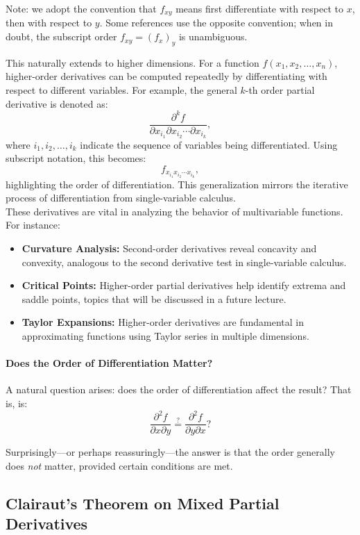 \noindent Note: we adopt the convention that \( f_{xy} \) means first differentiate with respect to \( x \), then with respect to \( y \). Some references use the opposite convention; when in doubt, the subscript order \( f_{xy} = (f_x)_y \) is unambiguous.

\noindent This naturally extends to higher dimensions. For a function \( f(x_1, x_2, \ldots, x_n) \), higher-order derivatives can be computed repeatedly by differentiating with respect to different variables. For example, the general \( k \)-th order partial derivative is denoted as:
\[
\frac{\partial^k f}{\partial x_{i_1} \partial x_{i_2} \cdots \partial x_{i_k}},
\]
where \( i_1, i_2, \ldots, i_k \) indicate the sequence of variables being differentiated. Using subscript notation, this becomes:
\[
f_{x_{i_1}x_{i_2}\cdots x_{i_k}},
\]
highlighting the order of differentiation. This generalization mirrors the iterative process of differentiation from single-variable calculus. \\

\noindent These derivatives are vital in analyzing the behavior of multivariable functions. For instance:
\begin{itemize}
    \item \textbf{Curvature Analysis:} Second-order derivatives reveal concavity and convexity, analogous to the second derivative test in single-variable calculus.
    \item \textbf{Critical Points:} Higher-order partial derivatives help identify extrema and saddle points, topics that will be discussed in a future lecture.
    \item \textbf{Taylor Expansions:} Higher-order derivatives are fundamental in approximating functions using Taylor series in multiple dimensions.
\end{itemize}

\paragraph{Does the Order of Differentiation Matter?}
A natural question arises: does the order of differentiation affect the result? That is, is:
\[
\frac{\partial^2 f}{\partial x \partial y} \stackrel{?}{=} \frac{\partial^2 f}{\partial y \partial x}?
\]

\noindent Surprisingly—or perhaps reassuringly—the answer is that the order generally does \textit{not} matter, provided certain conditions are met. 


\subsection*{Clairaut's Theorem on Mixed Partial Derivatives} 

